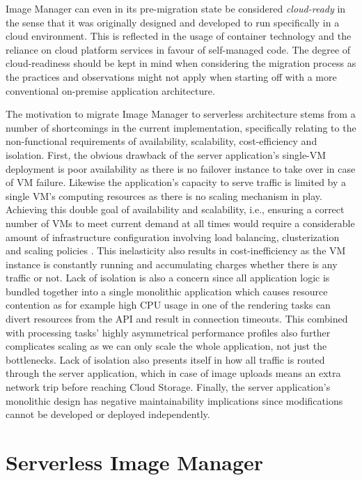 Image Manager can even in its pre-migration state be considered \textit{cloud-ready} in the sense that it was originally designed and developed to run specifically in a cloud environment. This is reflected in the usage of container technology and the reliance on cloud platform services in favour of self-managed code. The degree of cloud-readiness should be kept in mind when considering the migration process as the practices and observations might not apply when starting off with a more conventional on-premise application architecture.

The motivation to migrate Image Manager to serverless architecture stems from a number of shortcomings in the current implementation, specifically relating to the non-functional requirements of availability, scalability, cost-efficiency and isolation. First, the obvious drawback of the server application's single-VM deployment is poor availability as there is no failover instance to take over in case of VM failure. Likewise the application's capacity to serve traffic is limited by a single VM's computing resources as there is no scaling mechanism in play. Achieving this double goal of availability and scalability, i.e., ensuring a correct number of VMs to meet current demand at all times would require a considerable amount of infrastructure configuration involving load balancing, clusterization and scaling policies \parencite{jonas19berkeleyView}. This inelasticity also results in cost-inefficiency as the VM instance is constantly running and accumulating charges whether there is any traffic or not. Lack of isolation is also a concern since all application logic is bundled together into a single monolithic application which causes resource contention as for example high CPU usage in one of the rendering tasks can divert resources from the API and result in connection timeouts. This combined with processing tasks' highly asymmetrical performance profiles also further complicates scaling as we can only scale the whole application, not just the bottlenecks. Lack of isolation also presents itself in how all traffic is routed through the server application, which in case of image uploads means an extra network trip before reaching Cloud Storage. Finally, the server application's monolithic design has negative maintainability implications since modifications cannot be developed or deployed independently.

\section{Serverless Image Manager}

